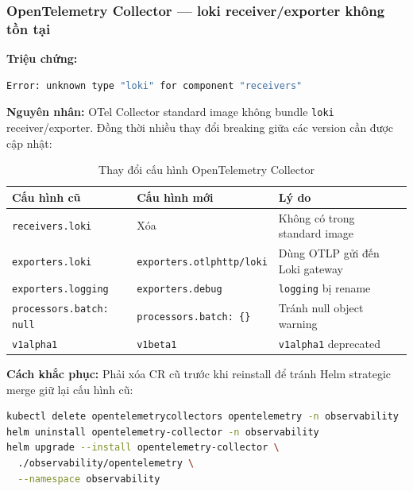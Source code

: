 \subsubsection{OpenTelemetry Collector — loki receiver/exporter không tồn tại}

\textbf{Triệu chứng:}

\begin{lstlisting}[language=bash]
Error: unknown type "loki" for component "receivers"
\end{lstlisting}

\textbf{Nguyên nhân:} OTel Collector standard image không bundle \texttt{loki} receiver/exporter. Đồng thời nhiều thay đổi breaking giữa các version cần được cập nhật:

\begin{table}[H]
\centering
\renewcommand{\arraystretch}{1.3}
\begin{tabular}{|p{4cm}|p{4cm}|p{6cm}|}
\hline
\textbf{Cấu hình cũ} & \textbf{Cấu hình mới} & \textbf{Lý do} \\
\hline
\texttt{receivers.loki} & Xóa & Không có trong standard image \\
\hline
\texttt{exporters.loki} & \texttt{exporters.otlphttp/loki} & Dùng OTLP gửi đến Loki gateway \\
\hline
\texttt{exporters.logging} & \texttt{exporters.debug} & \texttt{logging} bị rename \\
\hline
\texttt{processors.batch: null} & \texttt{processors.batch: \{\}} & Tránh null object warning \\
\hline
\texttt{v1alpha1} & \texttt{v1beta1} & \texttt{v1alpha1} deprecated \\
\hline
\end{tabular}
\caption{Thay đổi cấu hình OpenTelemetry Collector}
\end{table}

\textbf{Cách khắc phục:} Phải xóa CR cũ trước khi reinstall để tránh Helm strategic merge giữ lại cấu hình cũ:

\begin{lstlisting}[language=bash]
kubectl delete opentelemetrycollectors opentelemetry -n observability
helm uninstall opentelemetry-collector -n observability
helm upgrade --install opentelemetry-collector \
  ./observability/opentelemetry \
  --namespace observability
\end{lstlisting}

